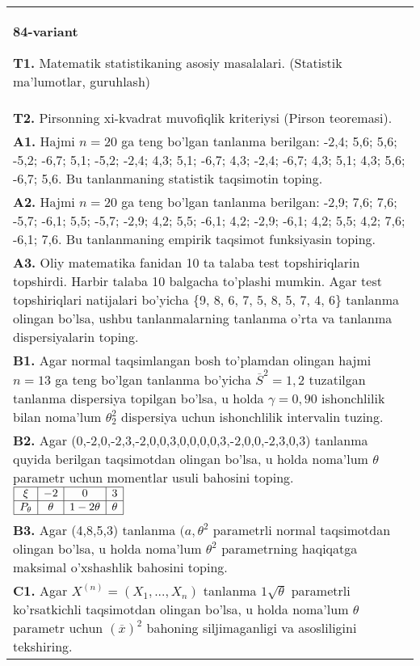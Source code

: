 \documentclass{article}
\begin{document}
\begin{tabular}{m{17cm}}
\textbf{84-variant}
\newline

\textbf{T1.} Matematik statistikaning asosiy masalalari. (Statistik ma'lumotlar, guruhlash)
\\
\textbf{T2.} 
Pirsonning xi-kvadrat muvofiqlik kriteriysi (Pirson teoremasi).
\\
\textbf{A1.} 
Hajmi \(n = 20\) ga teng bo'lgan tanlanma berilgan: -2,4; 5,6; 5,6; -5,2; -6,7; 5,1; -5,2; -2,4; 4,3; 5,1; -6,7; 4,3; -2,4; -6,7; 4,3; 5,1; 4,3; 5,6; -6,7; 5,6. Bu tanlanmaning statistik taqsimotin toping.
\\
\textbf{A2.} 
Hajmi \(n = 20\) ga teng bo'lgan tanlanma berilgan: -2,9; 7,6; 7,6; -5,7; -6,1; 5,5; -5,7; -2,9; 4,2; 5,5; -6,1; 4,2; -2,9; -6,1; 4,2; 5,5; 4,2; 7,6; -6,1; 7,6. Bu tanlanmaning empirik taqsimot funksiyasin toping.
\\
\textbf{A3.} 
Oliy matematika fanidan 10 ta talaba test topshiriqlarin topshirdi. Harbir talaba 10 balgacha to'plashi mumkin. Agar test topshiriqlari natijalari bo'yicha \{9, 8, 6, 7, 5, 8, 5, 7, 4, 6\} tanlanma olingan bo'lsa, ushbu tanlanmalarning tanlanma o'rta va tanlanma dispersiyalarin toping.
\\
\textbf{B1.} 
Agar normal taqsimlangan bosh to'plamdan olingan hajmi \(n = 13\) ga teng bo'lgan tanlanma bo'yicha \({\overline{S}}^{2} = 1,2\) tuzatilgan tanlanma dispersiya topilgan bo'lsa, u holda \(\gamma = 0,90\) ishonchlilik bilan noma'lum \(\theta_{2}^{2}\) dispersiya uchun ishonchlilik intervalin tuzing.
\\
\textbf{B2.} 
Agar (0,-2,0,-2,3,-2,0,0,3,0,0,0,0,3,-2,0,0,-2,3,0,3) tanlanma quyida berilgan taqsimotdan olingan bo'lsa, u holda noma'lum \(\theta\) parametr uchun momentlar usuli bahosini toping.
$\begin{array}{|c|c|c|c|}
    \hline
    \xi & - 2 & 0 & 3 \\
    \hline
    P_{\theta} & \theta & 1 - 2\theta & \theta \\
    \hline
\end{array}$
\\
\textbf{B3.} 
Agar (4,8,5,3) tanlanma \((a,\theta^{2}\) parametrli normal taqsimotdan olingan bo'lsa, u holda noma'lum \(\theta^{2}\) parametrning haqiqatga maksimal o'xshashlik bahosini toping.
\\
\textbf{C1.} 
Agar \(X^{(n)} = \left( X_{1},...,X_{n} \right)\) tanlanma \(1\sqrt{\theta}\) parametrli ko'rsatkichli taqsimotdan olingan bo'lsa, u holda noma'lum \(\theta\) parametr uchun \((\overline{x})^{2}\) bahoning siljimaganligi va asosliligini tekshiring.

\end{tabular}
\end{document}
